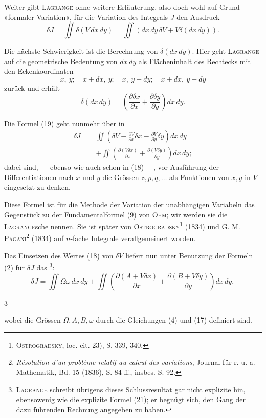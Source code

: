 Weiter gibt \textsc{Lagrange} ohne weitere Erläuterung, also doch wohl auf Grund
»formaler Variation«, für die Variation des Integrals $J$ den Ausdruck
\begin{equation*}
\delta J=\iint\delta(V\,dx\,dy)=\iint(dx\,dy\,\delta V+V\delta(dx\,dy)).\tag{19}
\end{equation*}

Die nächste Schwierigkeit ist die Berechnung von $\delta(dx\,dy)$. Hier geht
\textsc{Lagrange} auf die geometrische Bedeutung von $dx\,dy$ als Flächeninhalt des
Rechtecks mit den Eckenkoordinaten
\[
x,\ y;\quad x+dx,\ y;\quad x,\ y+dy;\quad x+dx,\ y+dy
\]
zurück und erhält
\begin{equation*}
\delta(dx\,dy)=\left(\frac{\partial\delta x}{\partial x}+\frac{\partial\delta y}{\partial y}\right)dx\,dy.\tag{20}
\end{equation*}

Die Formel (19) geht nunmehr über in
\begin{equation*}
\begin{aligned}
\delta J={}&\iint\left(\delta V-\frac{\partial V}{\partial x}\delta x-\frac{\partial V}{\partial y}\delta y\right)dx\,dy\\
&+\iint\left(\frac{\partial(V\delta x)}{\partial x}+\frac{\partial(V\delta y)}{\partial y}\right)dx\,dy;
\end{aligned}\tag{21}
\end{equation*}
dabei sind, — ebenso wie auch schon in (18) —, vor Ausführung der Differentiationen
nach $x$ und $y$ die Grössen $z,p,q,\ldots$ als Funktionen von $x,y$ in
$V$ eingesetzt zu denken.

Diese Formel ist für die Methode der Variation der unabhängigen Variabeln
das Gegenstück zu der Fundamentalformel (9) von \textsc{Ohm}; wir werden
sie die \textsc{Lagrange}sche  nennen. Sie ist später von
\textsc{Ostrogradsky}\footnote{\textsc{Ostrogradsky}, loc. cit. 23), S. 339, 340.} (1834) und \textsc{G. M. Pagani}\footnote{\textit{Résolution d'un problème relatif au calcul des variations}, Journal für r. u. a. Mathematik, Bd. 15 (1836), S. 84 ff., insbes. S. 92.} (1834) auf $n$-fache Integrale
verallgemeinert worden.

Das Einsetzen des Wertes (18) von $\delta V$ liefert nun unter Benutzung der
Formeln (2) für $\delta J$ das \footnote{\textsc{Lagrange} schreibt übrigens dieses Schlussresultat gar nicht explizite hin, ebensowenig wie die explizite Formel (21); er begnügt sich, den Gang der dazu führenden Rechnung angegeben zu haben.}:
\begin{equation*}
\delta J=\iint\Omega\omega\,dx\,dy+\iint\left(\frac{\partial(A+V\delta x)}{\partial x}+\frac{\partial(B+V\delta y)}{\partial y}\right)dx\,dy,\tag{22}
\end{equation*}
\par\smallskip{}\hfill{\small 3}\par
\clearpage{}
\noindent wobei die Grössen $\Omega,A,B,\omega$ durch die Gleichungen (4) und (17) definiert
sind.

